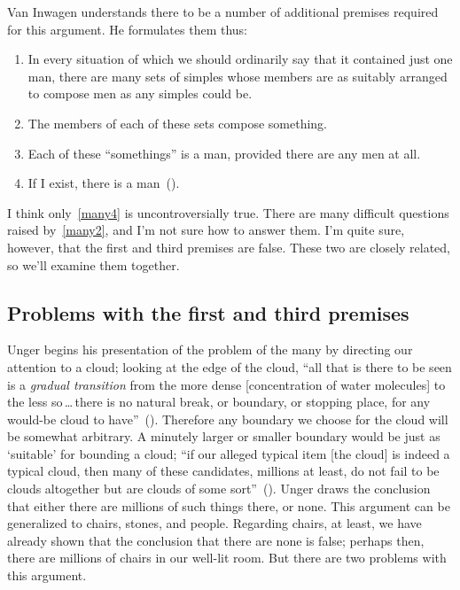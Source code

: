 \documentclass[11pt]{article}
\begin{document}
\begin{spacing}{1.5}
Van Inwagen understands there to be a number of additional premises
required for this argument.  He formulates them thus:
\begin{enumerate}
	\item In every situation of which we should ordinarily say
          that it contained just one man, there are many sets of
          simples whose members are as suitably arranged to compose
          men as any simples could be.  \label{many1}
	\item The members of each of these sets compose
          something.  \label{many2}
	\item Each of these ``somethings'' is a man, provided there
          are any men at all.  \label{many3}
	\item If I exist, there is a
          man~(\citeyear[216]{inwagen1995}).  \label{many4}
\end{enumerate}
I think only~\ref{many4} is uncontroversially true.  There are many
difficult questions raised by~\ref{many2}, and I'm not sure how to
answer them.  I'm quite sure, however, that the first and third
premises are false.  These two are closely related, so we'll examine
them together.

\subsection{Problems with the first and third premises}
\label{many13p}
Unger begins his presentation of the problem of the many by directing
our attention to a cloud; looking at the edge of the cloud, ``all that
is there to be seen is a {\em gradual transition} from the more dense
[concentration of water molecules] to the less so\,\ldots\,there is no
natural break, or boundary, or stopping place, for any would-be cloud
to have''~(\citeyear[415]{unger1980a}).  Therefore any boundary we
choose for the cloud will be somewhat arbitrary.  A minutely larger or
smaller boundary would be just as `suitable' for bounding a cloud;
``if our alleged typical item [the cloud] is indeed a typical cloud,
then many of these candidates, millions at least, do not fail to be
clouds altogether but are clouds of some
sort''~(\citeyear[421]{unger1980a}).  Unger draws the conclusion that
either there are millions of such things there, or none.  This
argument can be generalized to chairs, stones, and people.  Regarding
chairs, at least, we have already shown that the conclusion that there
are none is false; perhaps then, there are millions of chairs in our
well-lit room.  But there are two problems with this argument.


\end{spacing}
\end{document}

